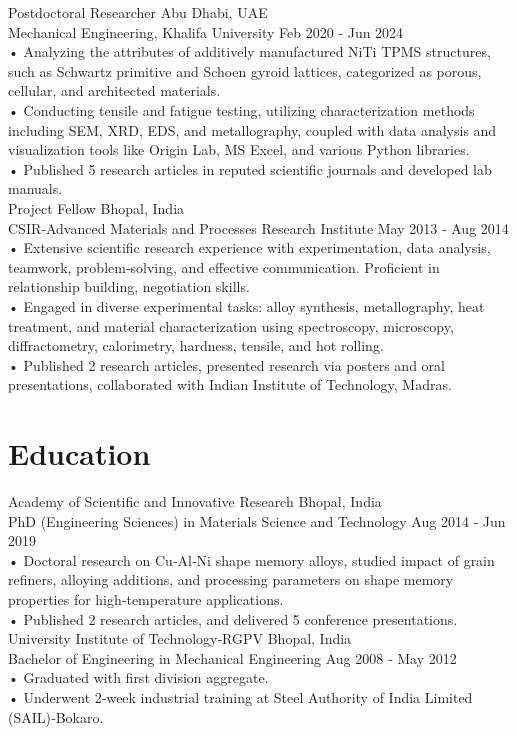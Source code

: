 \documentclass[a4paper]{article}
\begin{document}
Postdoctoral Researcher Abu Dhabi, UAE\\
Mechanical Engineering, Khalifa University Feb 2020 ‑ Jun 2024\\
• Analyzing the attributes of additively manufactured NiTi TPMS structures, such as Schwartz primitive and Schoen
gyroid lattices, categorized as porous, cellular, and architected materials.\\
• Conducting tensile and fatigue testing, utilizing characterization methods including SEM, XRD, EDS, and metallography,
coupled with data analysis and visualization tools like Origin Lab, MS Excel, and various Python libraries.\\
• Published 5 research articles in reputed scientific journals and developed lab manuals.\\

Project Fellow Bhopal, India\\
CSIR‑Advanced Materials and Processes Research Institute May 2013 ‑ Aug 2014\\
• Extensive scientific research experience with experimentation, data analysis, teamwork, problem‑solving, and effective
communication. Proficient in relationship building, negotiation skills.\\
• Engaged in diverse experimental tasks: alloy synthesis, metallography, heat treatment, and material characterization
using spectroscopy, microscopy, diffractometry, calorimetry, hardness, tensile, and hot rolling.\\
• Published 2 research articles, presented research via posters and oral presentations, collaborated with Indian Institute
of Technology, Madras.\\

\section*{Education}
Academy of Scientific and Innovative Research Bhopal, India\\
PhD (Engineering Sciences) in Materials Science and Technology Aug 2014 ‑ Jun 2019\\
• Doctoral research on Cu‑Al‑Ni shape memory alloys, studied impact of grain refiners, alloying additions, and processing
parameters on shape memory properties for high‑temperature applications.\\
• Published 2 research articles, and delivered 5 conference presentations.\\

University Institute of Technology‑RGPV Bhopal, India\\
Bachelor of Engineering in Mechanical Engineering Aug 2008 ‑ May 2012\\
• Graduated with first division aggregate.\\
• Underwent 2‑week industrial training at Steel Authority of India Limited (SAIL)‑Bokaro.\\
\end{document}
